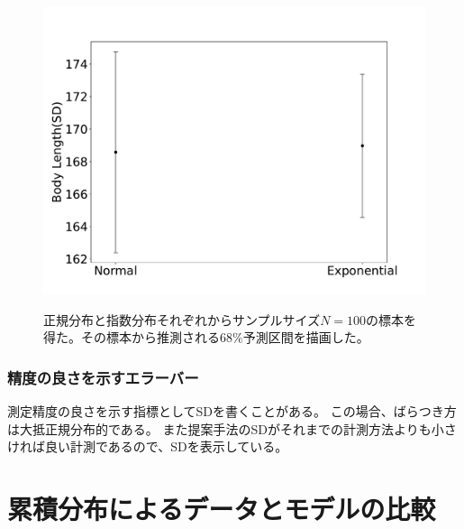 \begin{figure}
 \begin{center}
  \includegraphics[width=15cm]{./image/12_/model_predict_SD.pdf}
  \label{fig:model_predict_SD}
  \caption{正規分布と指数分布それぞれからサンプルサイズ$N=100$の標本を得た。その標本から推測される$68\%$予測区間を描画した。}
 \end{center}
\end{figure}



\subsubsection{精度の良さを示すエラーバー}
測定精度の良さを示す指標としてSDを書くことがある。
この場合、ばらつき方は大抵正規分布的である。
また提案手法のSDがそれまでの計測方法よりも小さければ良い計測であるので、SDを表示している。







\section{累積分布によるデータとモデルの比較}

